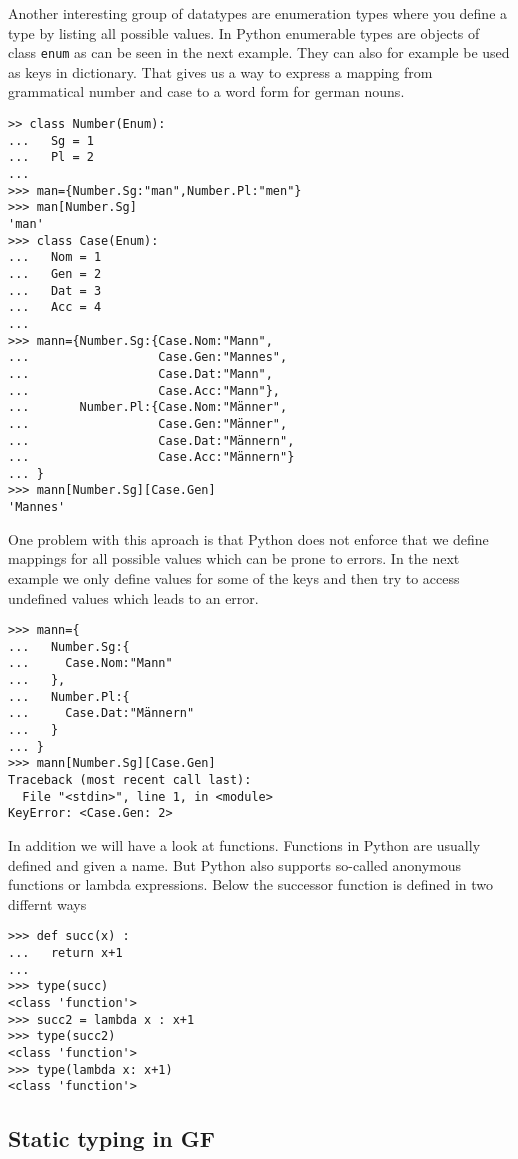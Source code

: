 \documentclass{scrartcl}
\begin{document}
Another interesting group of datatypes are enumeration types where you define a type by listing all possible values. In Python enumerable types are objects of class \texttt{enum} as can be seen in the next example. They can also for example be used as keys in dictionary. That gives us a way to express a mapping from grammatical number and case to a word form for german nouns.

\begin{verbatim}
>> class Number(Enum):
...   Sg = 1
...   Pl = 2
... 
>>> man={Number.Sg:"man",Number.Pl:"men"}
>>> man[Number.Sg]
'man'
>>> class Case(Enum):
...   Nom = 1
...   Gen = 2
...   Dat = 3
...   Acc = 4
... 
>>> mann={Number.Sg:{Case.Nom:"Mann", 
...                  Case.Gen:"Mannes", 
...                  Case.Dat:"Mann", 
...                  Case.Acc:"Mann"},
...       Number.Pl:{Case.Nom:"Männer", 
...                  Case.Gen:"Männer", 
...                  Case.Dat:"Männern", 
...                  Case.Acc:"Männern"}
... }
>>> mann[Number.Sg][Case.Gen]
'Mannes'
\end{verbatim}

One problem with this aproach is that Python does not enforce that we define mappings for all possible values which can be prone to errors. In the next example we only define values for some of the keys and then try to access undefined values which leads to an error.

\begin{verbatim}
>>> mann={
...   Number.Sg:{
...     Case.Nom:"Mann"
...   },
...   Number.Pl:{
...     Case.Dat:"Männern"
...   }
... }
>>> mann[Number.Sg][Case.Gen]
Traceback (most recent call last):
  File "<stdin>", line 1, in <module>
KeyError: <Case.Gen: 2>
\end{verbatim}

In addition we will have a look at functions. Functions in Python are usually defined and given a name. But Python also supports so-called
anonymous functions or lambda expressions. Below the successor function is defined in two differnt ways
\begin{verbatim}
>>> def succ(x) :
...   return x+1
... 
>>> type(succ)
<class 'function'>
>>> succ2 = lambda x : x+1
>>> type(succ2)
<class 'function'>
>>> type(lambda x: x+1)
<class 'function'>
\end{verbatim}

\subsection{Static typing in GF}
\end{document}
